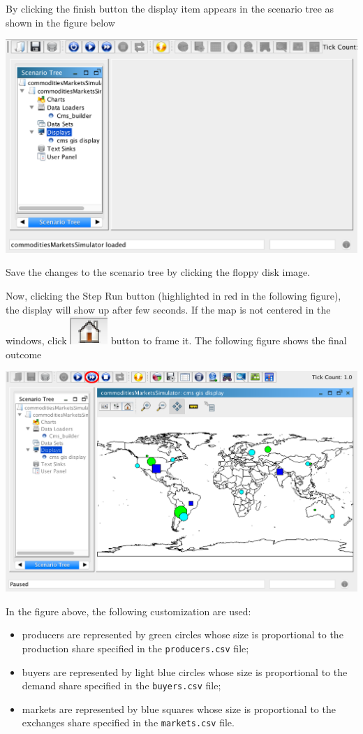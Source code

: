 \documentclass{article}
\begin{document}
By clicking the finish button the display item appears in the scenario tree as shown in the figure below

\includegraphics[scale=0.35]{fig_cms_rs_gis9}

Save the changes to the scenario tree by clicking the floppy disk image.

Now, clicking the Step Run button (highlighted in red in the following figure), the display will show up after few seconds. If the map is not centered in the windows, click \includegraphics[scale=0.4]{fig_home} button to frame it. The following figure shows the final outcome  

\includegraphics[scale=0.35]{fig_cms_rs_gis10}

In the figure above, the following customization are used:
\begin{itemize}
	\item producers are represented by green circles whose size is proportional to the production share specified in the \verb+producers.csv+ file;
	\item buyers are represented by light blue circles whose size is proportional to the demand share specified in the \verb+buyers.csv+ file;
	\item markets are represented by blue squares whose size is proportional to the exchanges share specified in the \verb+markets.csv+ file.
\end{itemize}
\end{document}
